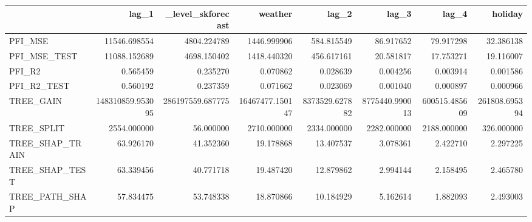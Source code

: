 \begin{tabular}{lrrrrrrr}
\toprule
 & lag_1 & _level_skforecast & weather & lag_2 & lag_3 & lag_4 & holiday \\
\midrule
PFI_MSE & 11546.698554 & 4804.224789 & 1446.999906 & 584.815549 & 86.917652 & 79.917298 & 32.386138 \\
PFI_MSE_TEST & 11088.152689 & 4698.150402 & 1418.440320 & 456.617161 & 20.581817 & 17.753271 & 19.116007 \\
PFI_R2 & 0.565459 & 0.235270 & 0.070862 & 0.028639 & 0.004256 & 0.003914 & 0.001586 \\
PFI_R2_TEST & 0.560192 & 0.237359 & 0.071662 & 0.023069 & 0.001040 & 0.000897 & 0.000966 \\
TREE_GAIN & 148310859.953095 & 286197559.687775 & 16467477.150147 & 8373529.627882 & 8775440.990013 & 600515.485609 & 261808.695394 \\
TREE_SPLIT & 2554.000000 & 56.000000 & 2710.000000 & 2334.000000 & 2282.000000 & 2188.000000 & 326.000000 \\
TREE_SHAP_TRAIN & 63.926170 & 41.352360 & 19.178868 & 13.407537 & 3.078361 & 2.422710 & 2.297225 \\
TREE_SHAP_TEST & 63.339456 & 40.771718 & 19.487420 & 12.879862 & 2.994144 & 2.158495 & 2.465780 \\
TREE_PATH_SHAP & 57.834475 & 53.748338 & 18.870866 & 10.184929 & 5.162614 & 1.882093 & 2.493003 \\
\bottomrule
\end{tabular}

